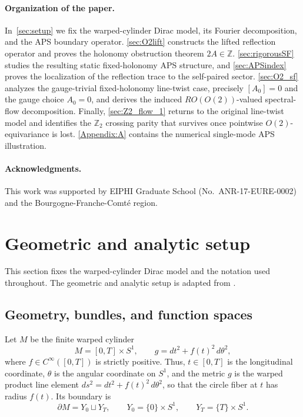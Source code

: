 \documentclass[11pt]{article}
\theoremstyle{definition}
\numberwithin{equation}{section}
\begin{document}
\paragraph{Organization of the paper.}
In~\autoref{sec:setup} we fix the warped-cylinder Dirac model, its Fourier decomposition, and the APS boundary operator.  \autoref{sec:O2lift} constructs the lifted reflection operator and proves the holonomy obstruction theorem \(2A\in\mathbb Z\).  \autoref{sec:rigorousSF} studies the resulting static
fixed-holonomy APS structure, and \autoref{sec:APSindex} proves the localization of the reflection trace to the self-paired sector.  \autoref{sec:O2_sf} analyzes the gauge-trivial fixed-holonomy line-twist case, precisely \([A_0]=0\) and the
gauge choice \(A_0=0\), and derives the induced \(RO(O(2))\)-valued spectral-flow decomposition.  Finally, \autoref{sec:Z2_flow_1} returns to the original line-twist model and identifies the \(\mathbb Z_2\) crossing parity that survives
once pointwise \(O(2)\)-equivariance is lost.  \autoref{Appendix:A} contains the numerical single-mode APS illustration.




\paragraph{Acknowledgments.}
This work was supported by EIPHI Graduate School (No.~ANR-17-EURE-0002) and the Bourgogne-Franche-Comté region.




\section{Geometric and analytic setup}\label{sec:setup}

This section fixes the warped-cylinder Dirac model and the notation used throughout. The geometric and analytic setup is adapted from \cite{KS}.

\subsection{Geometry, bundles, and function spaces}
Let \(M\) be the finite warped cylinder
\begin{equation}\label{eq:MT_metric}
M=[0,T]\times S^1,
\qquad
g=dt^2+f(t)^2\,d\theta^2,
\end{equation}
where \(f\in C^\infty([0,T])\) is strictly positive. Thus, \(t\in[0,T]\) is the longitudinal coordinate, \(\theta\) is the angular coordinate on \(S^1\), and the metric \(g\) is the warped product line element \(ds^2=dt^2+f(t)^2\,d\theta^2\), so that the circle fiber at \(t\) has radius \(f(t)\).
Its boundary is
\begin{equation}\label{eq:boundary_decomp}
\partial M=Y_0\sqcup Y_T,
\qquad
Y_0=\{0\}\times S^1,
\qquad
Y_T=\{T\}\times S^1.
\end{equation}
\end{document}
